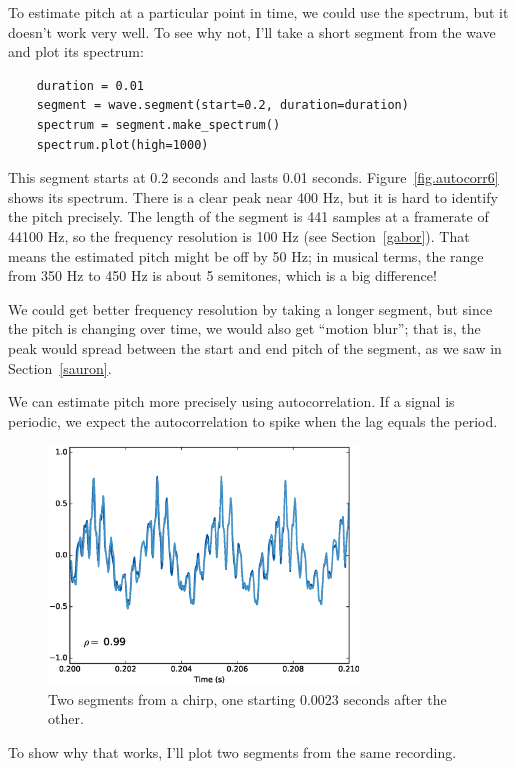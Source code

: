 \documentclass[12pt]{book}
\begin{document}
To estimate pitch at a particular point in time, we could use the
spectrum, but it doesn't work very well.  To see why not, I'll take
a short segment from the wave and plot its spectrum:

\begin{verbatim}
    duration = 0.01
    segment = wave.segment(start=0.2, duration=duration)
    spectrum = segment.make_spectrum()
    spectrum.plot(high=1000)
\end{verbatim}

This segment starts at 0.2 seconds and lasts 0.01 seconds.
Figure~\ref{fig.autocorr6} shows its spectrum.  There is a clear peak
near 400 Hz, but it is hard to identify the pitch precisely.  The
length of the segment is 441 samples at a framerate of 44100 Hz, so
the frequency resolution is 100 Hz (see Section~\ref{gabor}).
That means the estimated pitch might be off by 50 Hz; in musical
terms, the range from 350 Hz to 450 Hz is about 5 semitones, which is
a big difference!

We could get better frequency resolution by taking a longer segment,
but since the pitch is changing over time, we would also get ``motion
blur''; that is, the peak would spread between the start and end pitch of
the segment, as we saw in Section~\ref{sauron}.

We can estimate pitch more precisely using autocorrelation.
If a signal is periodic, we expect the autocorrelation to spike
when the lag equals the period.

\begin{figure}
\centerline{\includegraphics[height=2.5in]{figs/autocorr7.eps}}
\caption{Two segments from a chirp, one starting 0.0023 seconds
after the other.}
\label{fig.autocorr7}
\end{figure}

To show why that works, I'll plot two segments from the same
recording.
\end{document}
